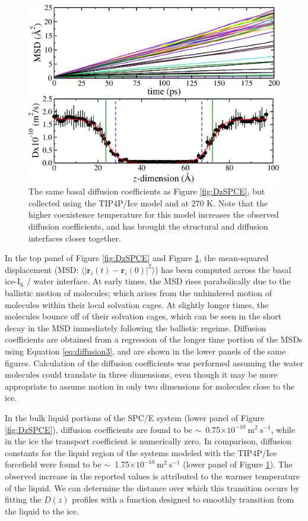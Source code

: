 \begin{figure}
\includegraphics[width=\linewidth]{Figures/DzTIP4PIce}
\caption{\label{fig:DzTIP4PIce} The same basal diffusion coefficients
  as Figure \ref{fig:DzSPCE}, but collected using the TIP4P/Ice model
  and at 270 K. Note that the higher coexistence temperature for this
  model increases the observed diffusion coefficients, and has brought
  the structural and diffusion interfaces closer together.}
\end{figure}

In the top panel of Figure \ref{fig:DzSPCE} and Figure
\ref{fig:DzTIP4PIce}, the mean-squared displacement (MSD:
$\langle | \mathbf{r}_i(t) - \mathbf{r}_i(0) |^2 \rangle $) has been
computed across the basal ice-I$_\mathrm{h}$ / water interface. At
early times, the MSD rises parabolically due to the ballistic motion
of molecules; which arises from the unhindered motion of molecules
within their local solvation cages. At slightly longer times, the
molecules bounce off of their solvation cages, which can be seen in
the short decay in the MSD immediately following the ballistic
regeime. Diffusion coefficients are obtained from a regression of the
longer time portion of the MSDs using Equation \eqref{eq:diffusion3},
and are shown in the lower panels of the same figures. Calculation of
the diffusion coefficients was performed assuming the water molecules
could translate in three dimensions, even though it may be more
appropriate to assume motion in only two dimensions for molecules
close to the ice.

In the bulk liquid portions of the SPC/E system (lower panel of
Figure \ref{fig:DzSPCE}), diffusion coefficients are found to be
$\sim$~0.75$\times 10^{-10}~\mathrm{m}^{2}~\mathrm{s}^{-1 }$, while in
the ice the transport coefficient is numerically zero. In comparison,
diffusion constants for the liquid region of the systems modeled with
the TIP4P/Ice forcefield were found to be
$\sim$~1.75$\times 10^{-10}~\mathrm{m}^{2}~\mathrm{s}^{-1 }$ (lower
panel of Figure \ref{fig:DzTIP4PIce}). The observed increase in the
reported values is attributed to the warmer temperature of the
liquid. We can determine the distance over which this transition
occurs by fitting the $D(z)$ profiles with a function designed to
smoothly transition from the liquid to the ice.

